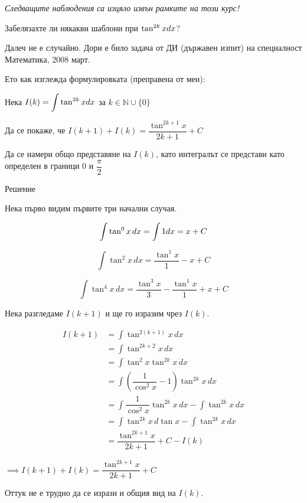 \documentclass{scrartcl}
\begin{document}
\begin{FlushLeft}
\emph{Следващите наблюдения са изцяло извън рамките на този курс!}

\hfill

Забелязахте ли някакви шаблони при $\tan^{2k}{x}\space dx$?

Далеч не е случайно. Дори е било задача от ДИ (държавен изпит) на специалност Математика, 2008 март.

\hfill

Ето как изглежда формулировката (преправена от мен):

Нека $I(k) = \displaystyle \int \tan^{2k}{x} \space dx$ за $k \in \mathbb{N}\cup \{0\}$

Да се покаже, че $I(k+1) + I(k) = \dfrac{\tan^{2k+1}{x}}{2k+1} + C$

Да се намери общо представяне на $I(k)$, като интегралът се представи като определен в граници $0$ и $\dfrac{\pi}{2}$

\vspace{5pt}

Решение

Нека първо видим първите три начални случая.

$$\displaystyle \int \tan^0{x}\, dx = \int 1 \space dx = x + C$$

$$\displaystyle \int \tan^2{x}\, dx = \dfrac{\tan^1{x}}{1} - x + C$$

$$\displaystyle \int \tan^4{x}\, dx = \dfrac{\tan^3{x}}{3} - \dfrac{\tan^1{x}}{1} + x + C$$

Нека разгледаме $I(k+1)$ и ще го изразим чрез $I(k)$.
\end{FlushLeft}

\begin{align*}
I(k+1)
&= \displaystyle \int \tan^{2(k+1)}{x}\,dx\\
&= \displaystyle \int \tan^{2k+2}{x}\,dx\\
&= \displaystyle \int \tan^2{x}\tan^{2k}{x}\,dx\\
&= \displaystyle \int \left(\dfrac{1}{\cos^2{x}} - 1\right)\tan^{2k}{x}\,dx\\
&= \displaystyle \int \dfrac{1}{\cos^2{x}}\tan^{2k}{x}\,dx - \int \tan^{2k}{x}\,dx\\
&= \displaystyle \int \tan^{2k}{x}\,d\tan{x} - \int \tan^{2k}{x}\,dx\\
&= \dfrac{\tan^{2k+1}{x}}{2k+1} + C - I(k)
\end{align*}

$\implies I(k+1) + I(k) = \dfrac{\tan^{2k+1}{x}}{2k+1} + C$

Оттук не е трудно да се изрази и общия вид на $I(k)$.
\end{document}
